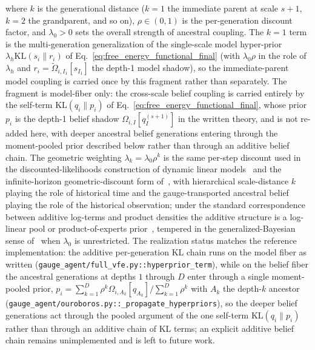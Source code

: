 \documentclass[11pt]{article}
\begin{document}
where $k$ is the generational distance ($k=1$ the immediate parent at scale $s+1$, $k=2$ the grandparent, and so on), $\rho \in (0, 1)$ is the per-generation discount factor, and $\lambda_0 > 0$ sets the overall strength of ancestral coupling. The $k=1$ term is the multi-generation generalization of the single-scale model hyper-prior $\lambda_h\mathrm{KL}(s_i \| r_i)$ of Eq.~\eqref{eq:free_energy_functional_final} (with $\lambda_0\rho$ in the role of $\lambda_h$ and $r_i = \tilde\Omega_{i,I_1}[s_{I_1}]$ the depth-1 model shadow), so the immediate-parent model coupling is carried once by this fragment rather than separately. The fragment is model-fiber only: the cross-scale belief coupling is carried entirely by the self-term $\mathrm{KL}(q_i \| p_i)$ of Eq.~\eqref{eq:free_energy_functional_final}, whose prior $p_i$ is the depth-1 belief shadow $\Omega_{i,I}[q_I^{(s+1)}]$ in the written theory, and is not re-added here, with deeper ancestral belief generations entering through the moment-pooled prior described below rather than through an additive belief chain. The geometric weighting $\lambda_k = \lambda_0\rho^k$ is the same per-step discount used in the discounted-likelihoods construction of dynamic linear models~\cite[\S 6.3]{WestHarrison1997} and the infinite-horizon geometric-discount form of~\cite{Smith1979}, with hierarchical scale-distance $k$ playing the role of historical time and the gauge-transported ancestral belief playing the role of the historical observation; under the standard correspondence between additive log-terms and product densities the additive structure is a log-linear pool or product-of-experts prior~\cite{GenestZidek1986, HintonPoE2002}, tempered in the generalized-Bayesian sense of~\cite{BissiriHolmesWalker2016} when $\lambda_0$ is unrestricted. The realization status matches the reference implementation: the additive per-generation KL chain runs on the model fiber as written (\texttt{gauge\_agent/full\_vfe.py::hyperprior\_term}), while on the belief fiber the ancestral generations at depths $1$ through $D$ enter through a single moment-pooled prior, $p_i = \sum_{k=1}^{D} \rho^k \Omega_{i,A_k}[q_{A_k}] / \sum_{k=1}^{D} \rho^k$ with $A_k$ the depth-$k$ ancestor (\texttt{gauge\_agent/ouroboros.py::\_propagate\_hyperpriors}), so the deeper belief generations act through the pooled argument of the one self-term $\mathrm{KL}(q_i \| p_i)$ rather than through an additive chain of KL terms; an explicit additive belief chain remains unimplemented and is left to future work.
\end{document}
